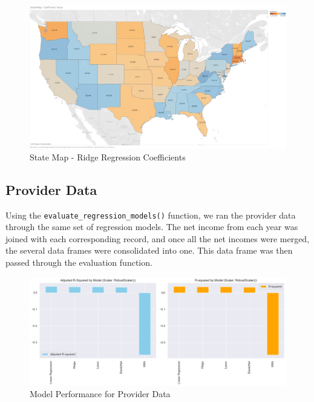 \documentclass{article}
\theoremstyle{mytheoremstyle}
\theoremstyle{mytheoremstyle}
\theoremstyle{myproblemstyle}
\begin{document}
\begin{figure}[htbp]
\centering
\includegraphics[width=\linewidth]{Images/State Map - Coefficient Value.png}
\caption{State Map - Ridge Regression Coefficients}
\label{fig:Robust Scaler Results}
\end{figure}



\pagebreak



\subsection{Provider Data}

Using the \texttt{evaluate\_regression\_models()} function, we ran the provider data through the same set of regression models. The net income from each year was joined with each corresponding record, and once all the net incomes were merged, the several data frames were consolidated into one. This data frame was then passed through the evaluation function. 

\begin{figure}[htbp]
\centering
\includegraphics[width=\linewidth]{Images/evalRegModelProviders.png}
\caption{Model Performance for Provider Data}
\label{fig:Robust Scaler Results}
\end{figure}
\end{document}
